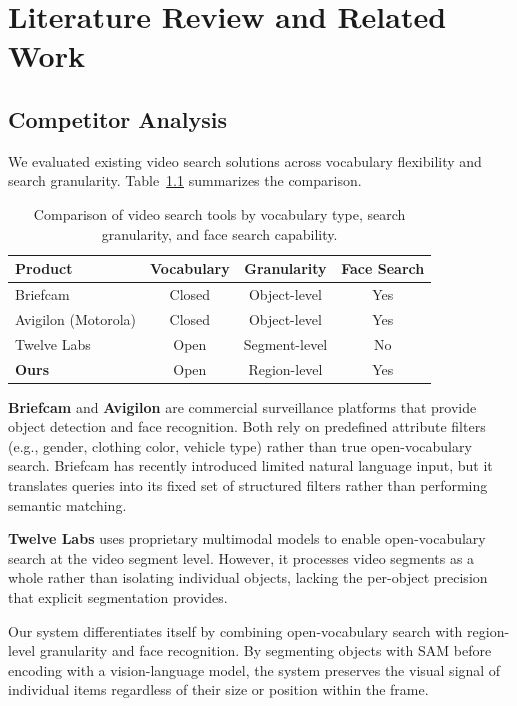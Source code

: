 \chapter{Literature Review and Related Work}
\label{chap:relatedworks}

\section{Competitor Analysis}
\label{section:competitor-analysis}

We evaluated existing video search solutions across vocabulary flexibility and search granularity. Table~\ref{tab:competitive-landscape} summarizes the comparison.

\begin{table}[h]
    \centering
    \begin{tabular}{lccc}
        \toprule
        \textbf{Product} & \textbf{Vocabulary} & \textbf{Granularity} & \textbf{Face Search} \\
        \midrule
        Briefcam & Closed & Object-level & Yes \\
        Avigilon (Motorola) & Closed & Object-level & Yes \\
        Twelve Labs & Open & Segment-level & No \\
        \midrule
        \textbf{Ours} & Open & Region-level & Yes \\
        \bottomrule
    \end{tabular}
    \caption{Comparison of video search tools by vocabulary type, search granularity, and face search capability.}
    \label{tab:competitive-landscape}
\end{table}

\textbf{Briefcam} and \textbf{Avigilon} are commercial surveillance platforms that provide object detection and face recognition. Both rely on predefined attribute filters (e.g., gender, clothing color, vehicle type) rather than true open-vocabulary search. Briefcam has recently introduced limited natural language input, but it translates queries into its fixed set of structured filters rather than performing semantic matching.

\textbf{Twelve Labs} uses proprietary multimodal models to enable open-vocabulary search at the video segment level. However, it processes video segments as a whole rather than isolating individual objects, lacking the per-object precision that explicit segmentation provides.

Our system differentiates itself by combining open-vocabulary search with region-level granularity and face recognition. By segmenting objects with SAM before encoding with a vision-language model, the system preserves the visual signal of individual items regardless of their size or position within the frame.

